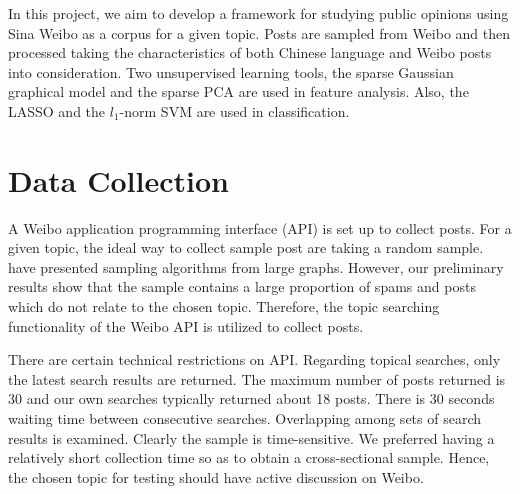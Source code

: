 \documentclass[11pt]{article}
\newcommand{\1}[1]{{\mathbf 1}\left\{#1\right\}}        %
\begin{document}
In this project, we aim to develop a framework for studying public opinions using Sina Weibo as a corpus for a given topic. Posts are sampled from Weibo and then processed taking the characteristics of both Chinese language and Weibo posts into consideration. Two unsupervised learning tools, the sparse Gaussian graphical model and the sparse PCA are used in feature analysis. Also, the LASSO and the $l_1$-norm SVM are used in classification. 


\section{Data Collection}\label{subsec:datacol}

A Weibo  application programming interface (API) is set up to collect posts.
For a given topic, the ideal way to collect sample post are taking a random sample. \cite{boyd2004fastest, leskovec2006sampling, wang2011understanding} have presented sampling algorithms from large graphs. However, our preliminary results show that the sample contains a large proportion of spams and posts which do not relate to the chosen topic. Therefore, the topic searching functionality of the Weibo API is utilized to collect posts. 

There are certain technical restrictions on API. Regarding topical searches, only the latest search results are returned. The maximum number of posts returned is 30 and our own searches typically returned about 18 posts. There is  30 seconds waiting time between consecutive searches. Overlapping among sets of search results is examined. Clearly the sample is time-sensitive. We preferred having a relatively short collection time so as to obtain a cross-sectional sample. Hence, the chosen topic for testing should have active discussion on Weibo. 
\end{document}
